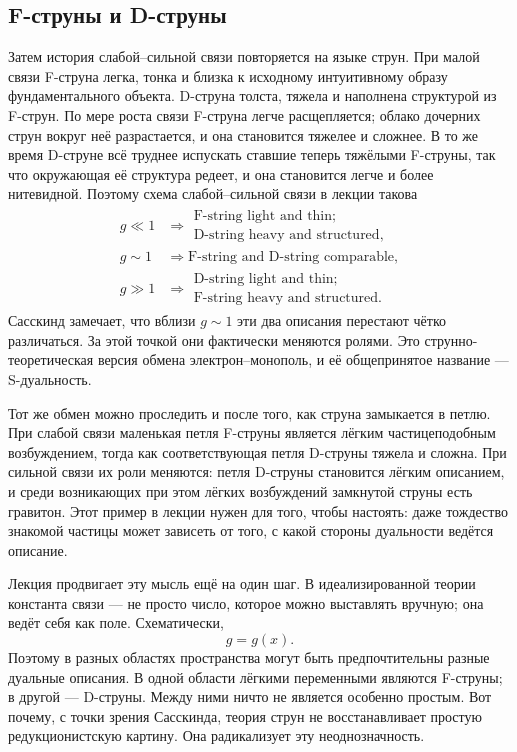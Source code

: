 \subsection{F-струны и D-струны}

Затем история слабой--сильной связи повторяется на языке струн. При малой связи F-струна легка, тонка и близка к исходному интуитивному образу фундаментального объекта. D-струна толста, тяжела и наполнена структурой из F-струн. По мере роста связи F-струна легче расщепляется; облако дочерних струн вокруг неё разрастается, и она становится тяжелее и сложнее. В то же время D-струне всё труднее испускать ставшие теперь тяжёлыми F-струны, так что окружающая её структура редеет, и она становится легче и более нитевидной. Поэтому схема слабой--сильной связи в лекции такова
\begin{align}
g \ll 1
&\Rightarrow
\begin{gathered}
\text{F-string light and thin;}\\
\text{D-string heavy and structured},
\end{gathered}\\
g \sim 1
&\Rightarrow
\text{F-string and D-string comparable},\\
g \gg 1
&\Rightarrow
\begin{gathered}
\text{D-string light and thin;}\\
\text{F-string heavy and structured}.
\end{gathered}
\end{align}
Сасскинд замечает, что вблизи \(g\sim 1\) эти два описания перестают чётко различаться. За этой точкой они фактически меняются ролями. Это струнно-теоретическая версия обмена электрон--монополь, и её общепринятое название — S-дуальность.

Тот же обмен можно проследить и после того, как струна замыкается в петлю. При слабой связи маленькая петля F-струны является лёгким частицеподобным возбуждением, тогда как соответствующая петля D-струны тяжела и сложна. При сильной связи их роли меняются: петля D-струны становится лёгким описанием, и среди возникающих при этом лёгких возбуждений замкнутой струны есть гравитон. Этот пример в лекции нужен для того, чтобы настоять: даже тождество знакомой частицы может зависеть от того, с какой стороны дуальности ведётся описание.

Лекция продвигает эту мысль ещё на один шаг. В идеализированной теории константа связи — не просто число, которое можно выставлять вручную; она ведёт себя как поле. Схематически,
\begin{equation}
g = g(x).
\end{equation}
Поэтому в разных областях пространства могут быть предпочтительны разные дуальные описания. В одной области лёгкими переменными являются F-струны; в другой — D-струны. Между ними ничто не является особенно простым. Вот почему, с точки зрения Сасскинда, теория струн не восстанавливает простую редукционистскую картину. Она радикализует эту неоднозначность.

